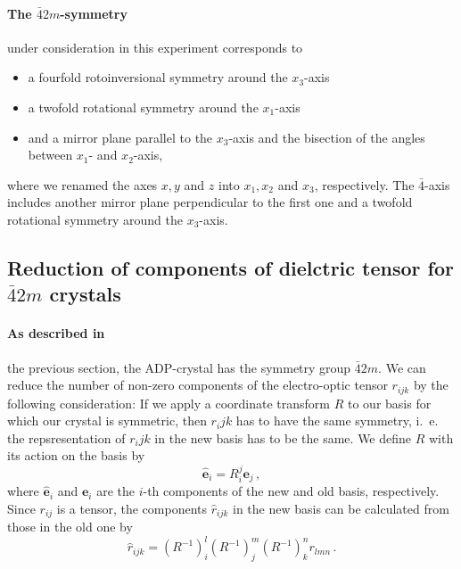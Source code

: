 \paragraph{The $\bar{4}2m$-symmetry}
under consideration in this experiment corresponds to 
\begin{itemize}
    \item
    a fourfold rotoinversional symmetry around the $x_3$-axis
    \item
    a twofold rotational symmetry around the $x_1$-axis
    \item
    and a mirror plane parallel to the $x_3$-axis and the bisection of the 
    angles between $x_1$- and $x_2$-axis, 
\end{itemize}
where we renamed the axes $x, y$ and $z$ into $x_1, x_2$ and $x_3$, respectively. 
The $\bar{4}$-axis includes another mirror 
plane perpendicular to the first one and a twofold rotational symmetry 
around the $x_3$-axis. 

\subsection{Reduction of components of dielctric tensor for $\bar{4}2m$ crystals}
\label{sec:reduce}
\paragraph{As described in} 
the previous section, the ADP-crystal has the symmetry group 
$\bar{4}2m$. We can reduce the number of non-zero components of the 
electro-optic tensor $r_{ijk}$ by the following consideration:
If we apply a coordinate transform $R$ to our basis for which 
our crystal is symmetric, then $r_ijk$ has to have the same symmetry, 
i.~e. the repsresentation of $r_ijk$ in the new basis has to be the same.
We define $R$ with its action on the basis by 
\begin{equation}
    \mathbf{\hat{e}}_i = R_i^j \mathbf{e}_j \, ,
\end{equation}
where $\mathbf{\hat{e}}_i$ and $\mathbf{e}_i$ are 
the $i$-th components of the new and old basis, respectively. 
Since $r_{ij}$ is a tensor, the components $\hat{r}_{ijk}$ in the 
new basis can be calculated from those in the old one by 
\begin{equation}
    \hat{r}_{ijk} = 
        \left( R^{-1}\right)_i^l
        \left( R^{-1}\right)_j^m
        \left( R^{-1}\right)_k^n
        r_{lmn} \, .
\end{equation}


